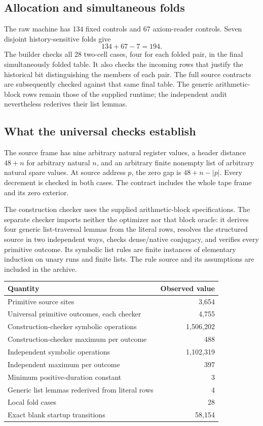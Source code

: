 \documentclass[10pt,letterpaper]{article}
\begin{document}
\subsection{Allocation and simultaneous folds}

The raw machine has 134 fixed controls and 67 axiom-reader controls. Seven
disjoint history-sensitive folds give
\[
                     134+67-7=194.
\]
The builder checks all 28 two-cell cases, four for each folded pair, in
the final simultaneously folded table. It also checks the incoming rows
that justify the historical bit distinguishing the members of each pair.
The full source contracts are subsequently checked against that same final
table. The generic arithmetic-block rows remain those of the supplied
runtime; the independent audit nevertheless rederives their list lemmas.

\subsection{What the universal checks establish}

The source frame has nine arbitrary natural register values, a header
distance \(48+n\) for arbitrary natural \(n\), and an arbitrary finite
nonempty list of arbitrary natural spare values. At source address \(p\),
the zero gap is \(48+n-|p|\). Every decrement is checked in both cases.
The contract includes the whole tape frame and its zero exterior.

The construction checker uses the supplied arithmetic-block specifications.
The separate checker imports neither the optimizer nor that block oracle:
it derives four generic list-traversal lemmas from the literal rows, resolves
the structured source in two independent ways, checks dense/native
conjugacy, and verifies every primitive outcome. Its symbolic list rules
are finite instances of elementary induction on unary runs and finite
lists. The rule source and its assumptions are included in the archive.

\begin{center}
\begin{tabular}{lr}
\toprule Quantity & Observed value\\\midrule
Primitive source sites & 3,654\\
Universal primitive outcomes, each checker & 4,755\\
Construction-checker symbolic operations & 1,506,202\\
Construction-checker maximum per outcome & 488\\
Independent symbolic operations & 1,102,319\\
Independent maximum per outcome & 397\\
Minimum positive-duration constant & 3\\
Generic list lemmas rederived from literal rows & 4\\
Local fold cases & 28\\
Exact blank startup transitions & 58,154\\
\bottomrule
\end{tabular}
\end{center}
\end{document}
